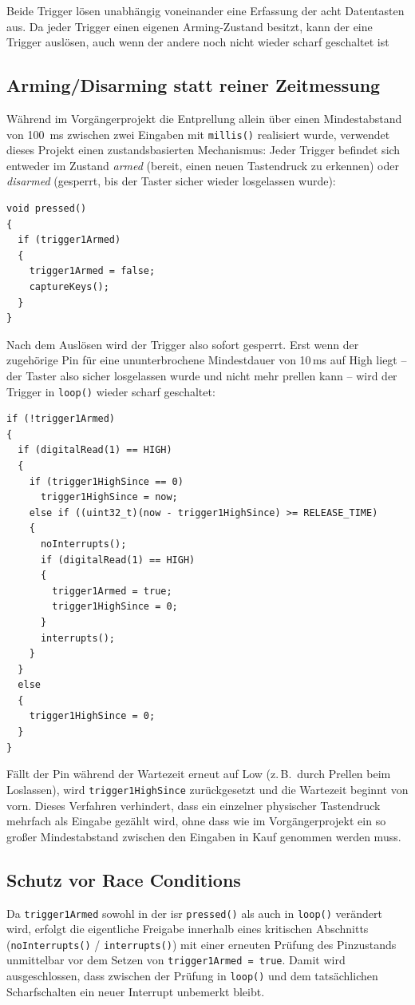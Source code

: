 \documentclass{article}
\begin{document}
Beide Trigger lösen unabhängig voneinander eine Erfassung der acht Datentasten aus. Da jeder Trigger einen eigenen Arming-Zustand besitzt, kann der eine Trigger auslösen, auch wenn der andere noch nicht wieder scharf geschaltet ist

\subsection{Arming/Disarming statt reiner Zeitmessung}
Während im Vorgängerprojekt die Entprellung allein über einen Mindestabstand von 100~ms zwischen zwei Eingaben mit \texttt{millis()} realisiert wurde, verwendet dieses Projekt einen zustandsbasierten Mechanismus: Jeder Trigger befindet sich entweder im Zustand \emph{armed} (bereit, einen neuen Tastendruck zu erkennen) oder \emph{disarmed} (gesperrt, bis der Taster sicher wieder losgelassen wurde):

\begin{lstlisting}[style=arduino]
void pressed()
{
  if (trigger1Armed)
  {
    trigger1Armed = false;
    captureKeys();
  }
}
\end{lstlisting}

Nach dem Auslösen wird der Trigger also sofort gesperrt. Erst wenn der zugehörige Pin für eine ununterbrochene Mindestdauer von 10\,ms auf High liegt -- der Taster also sicher losgelassen wurde und nicht mehr \gls{prellen} kann -- wird der Trigger in \texttt{loop()} wieder scharf geschaltet:
\begin{lstlisting}[style=arduino]
if (!trigger1Armed)
{
  if (digitalRead(1) == HIGH)
  {
    if (trigger1HighSince == 0)
      trigger1HighSince = now;
    else if ((uint32_t)(now - trigger1HighSince) >= RELEASE_TIME)
    {
      noInterrupts();
      if (digitalRead(1) == HIGH)
      {
        trigger1Armed = true;
        trigger1HighSince = 0;
      }
      interrupts();
    }
  }
  else
  {
    trigger1HighSince = 0;
  }
}
\end{lstlisting}

Fällt der Pin während der Wartezeit erneut auf Low (z.\,B.\ durch Prellen beim Loslassen), wird \texttt{trigger1HighSince} zurückgesetzt und die Wartezeit beginnt von vorn. Dieses Verfahren verhindert, dass ein einzelner physischer Tastendruck mehrfach als Eingabe gezählt wird, ohne dass wie im Vorgängerprojekt ein so großer Mindestabstand zwischen den Eingaben in Kauf genommen werden muss.

\subsection{Schutz vor Race Conditions}
Da \texttt{trigger1Armed} sowohl in der \gls{isr} \texttt{pressed()} als auch in \texttt{loop()} verändert wird, erfolgt die eigentliche Freigabe innerhalb eines kritischen Abschnitts (\texttt{noInterrupts()} / \texttt{interrupts()}) mit einer erneuten Prüfung des Pinzustands unmittelbar vor dem Setzen von \texttt{trigger1Armed~=~true}. Damit wird ausgeschlossen, dass zwischen der Prüfung in \texttt{loop()} und dem tatsächlichen Scharfschalten ein neuer Interrupt unbemerkt bleibt.
\end{document}
